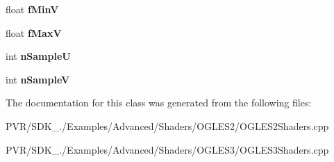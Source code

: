 \begin{DoxyCompactItemize}
\item 
\hypertarget{class_parametric_surface_ad4d4a096d737d476a191068dc3026835}{float {\bfseries f\+Min\+V}}\label{class_parametric_surface_ad4d4a096d737d476a191068dc3026835}

\item 
\hypertarget{class_parametric_surface_ae7150a107310e031c05bc29ebd303541}{float {\bfseries f\+Max\+V}}\label{class_parametric_surface_ae7150a107310e031c05bc29ebd303541}

\item 
\hypertarget{class_parametric_surface_ad4c27d45f3d6262b97bb023179e5ff51}{int {\bfseries n\+Sample\+U}}\label{class_parametric_surface_ad4c27d45f3d6262b97bb023179e5ff51}

\item 
\hypertarget{class_parametric_surface_a5bcac88dea39ed728246712a3eccaaf9}{int {\bfseries n\+Sample\+V}}\label{class_parametric_surface_a5bcac88dea39ed728246712a3eccaaf9}

\end{DoxyCompactItemize}


The documentation for this class was generated from the following files\+:\begin{DoxyCompactItemize}
\item 
P\+V\+R/\+S\+D\+K\+\_./\+Examples/\+Advanced/\+Shaders/\+O\+G\+L\+E\+S2/O\+G\+L\+E\+S2\+Shaders.\+cpp\item 
P\+V\+R/\+S\+D\+K\+\_./\+Examples/\+Advanced/\+Shaders/\+O\+G\+L\+E\+S3/O\+G\+L\+E\+S3\+Shaders.\+cpp\end{DoxyCompactItemize}
